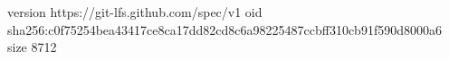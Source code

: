 version https://git-lfs.github.com/spec/v1
oid sha256:c0f75254bea43417ce8ca17dd82cd8c6a98225487ccbff310cb91f590d8000a6
size 8712
